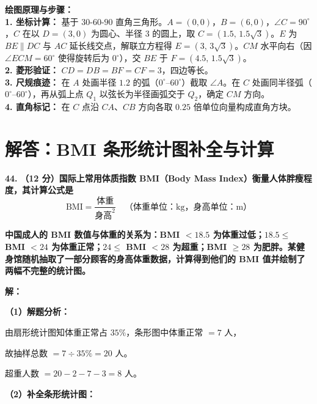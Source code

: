 \documentclass[12pt, a4paper]{ctexrep}
\begin{document}
\vspace{0.4cm}
{\small\color{blue!70!black}
\textbf{绘图原理与步骤：}\\
\textbf{1. 坐标计算：} 基于 $30$-$60$-$90$ 直角三角形。$A = (0,0)$，$B = (6,0)$，$\angle C = 90^\circ$，$C$ 在以 $D = (3,0)$ 为圆心、半径 $3$ 的圆上，取 $C = (1.5,\,1.5\sqrt{3})$。$E$ 为 $BE \parallel DC$ 与 $AC$ 延长线交点，解联立方程得 $E = (3,\,3\sqrt{3})$。$CM$ 水平向右（因 $\angle ECM = 60^\circ$ 使得旋转后为 $0^\circ$），交 $BE$ 于 $F = (4.5,\,1.5\sqrt{3})$。\\
\textbf{2. 菱形验证：} $CD = DB = BF = CF = 3$，四边等长。\\
\textbf{3. 尺规痕迹：} 在 $A$ 处画半径 $1.2$ 的弧（$0^\circ$--$60^\circ$）截取 $\angle A$。在 $C$ 处画同半径弧（$0^\circ$--$60^\circ$），再从弧上点 $Q_1$ 以弦长为半径画弧交于 $Q_2$，确定 $CM$ 方向。\\
\textbf{4. 直角标记：} 在 $C$ 点沿 $CA$、$CB$ 方向各取 $0.25$ 倍单位向量构成直角方块。
}

\newpage

\section{解答：BMI 条形统计图补全与计算}

\vspace{0.6cm}

\textbf{\LARGE 44.} \textbf{（12 分）国际上常用体质指数 BMI（Body Mass Index）衡量人体胖瘦程度，其计算公式是}
$$\text{BMI} = \frac{\text{体重}}{\text{身高}^2} \quad \text{（体重单位：kg，身高单位：m）}$$

\textbf{中国成人的 BMI 数值与体重的关系为：BMI $< 18.5$ 为体重过低；$18.5 \leqslant$ BMI $< 24$ 为体重正常；$24 \leqslant$ BMI $< 28$ 为超重；BMI $\geqslant 28$ 为肥胖。某健身馆随机抽取了一部分顾客的身高体重数据，计算得到他们的 BMI 值并绘制了两幅不完整的统计图。}

\vspace{0.4cm}
\textbf{解：}

\textbf{（1）解题分析：}

由扇形统计图知体重正常占 $35\%$，条形图中体重正常 $= 7$ 人，

故抽样总数 $= 7 \div 35\% = 20$ 人。

超重人数 $= 20 - 2 - 7 - 3 = 8$ 人。

\vspace{0.2cm}
\textbf{（2）补全条形统计图：}
\end{document}
